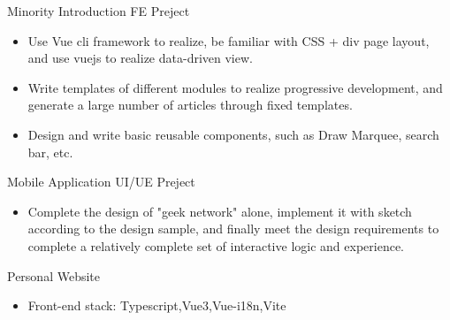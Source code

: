 \documentclass{resume}
\newcommand{\en}[1]{#1}
\newcommand{\zh}[1]{}
\begin{document}
\en{Minority Introduction FE Preject}
\zh{少数民族 Web 前端项目}
\begin{itemize}
      \item \en{Use Vue cli framework to realize, be familiar with CSS + div page layout, and use vuejs to realize data-driven view.}
            \zh{使用vue-cli框架来实现，熟悉CSS+DIV页面布局，用Vuejs实现数据驱动视图。}
      \item \en{Write templates of different modules to realize progressive development, and generate a large number of articles through fixed templates.}
            \zh{编写不同模块的template来实现渐进式开发，通过固定模板实现大量文章的生成。}
      \item \en{Design and write basic reusable components, such as Draw Marquee, search bar, etc.}
            \zh{设计并编写基础可复用的组件，如轮播图，搜索栏等。}
\end{itemize}

\en{Mobile Application UI/UE Preject}
\zh{极客网”交互设计方案}
\begin{itemize}
      \item \en{Complete the design of "geek network" alone, implement it with sketch according to the design sample, and finally meet the design requirements to complete a relatively complete set of interactive logic and experience.}
            \zh{独自完成”极客网”的设计，并按照设计样稿，采用Sketch进行实现，最终符合设计要求完成一套比较 完整的交互逻辑和体验。}
\end{itemize}

\en{Personal Website}
\zh{个人网站}
\begin{itemize}
      \item \en{Front-end stack: Typescript,Vue3,Vue-i18n,Vite}
            \zh{前端技术栈: TS，Vue3，Vue-i18，Vite}
\end{itemize}
\end{document}
